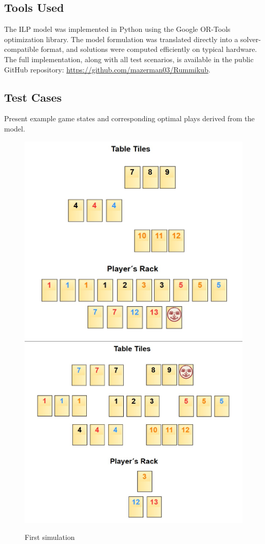 \documentclass[11pt,letterpaper]{article}
\begin{document}
\subsection*{Tools Used}
The ILP model was implemented in Python using the Google OR-Tools optimization library. The model formulation was translated directly into a solver-compatible format, and solutions were computed efficiently on typical hardware. The full implementation, along with all test scenarios, is available in the public GitHub repository: \url{https://github.com/mazerman03/Rummikub}.

\subsection*{Test Cases}
Present example game states and corresponding optimal plays derived from the model.

\newpage

\begin{figure}[H]
    \centering
    \includegraphics[width=.4\textwidth]{Figures/Initial_Board.png}
    \includegraphics[width=.4\textwidth]{Figures/Final_Board.png}
    \caption{First simulation}
\end{figure}

\newpage
\end{document}
